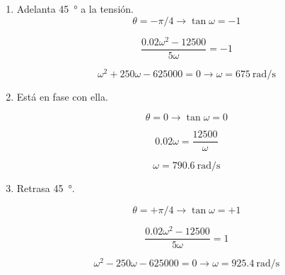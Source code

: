 \documentclass[12pt]{article}
\begin{document}
\begin{enumerate}
\item Adelanta \SI{45}{\degree} a la tensión.
  \begin{equation*}
    \theta = -\pi/4 \rightarrow \tan \omega = -1
  \end{equation*}

  \begin{equation*}
    \frac{0.02\omega^2 - 12500}{5\omega} = -1
  \end{equation*}

  \begin{equation*}
    \omega^2 + 250\omega - 625000 = 0 \rightarrow \boxed{\omega = \SI{675}{\radian\per\second}}
  \end{equation*}

  
\item Está en fase con ella.

  \begin{equation*}
    \theta = 0 \rightarrow \tan \omega = 0
  \end{equation*}

  \begin{equation*}
    0.02\omega = \frac{12500}{\omega}
  \end{equation*}

  \begin{equation*}
    \omega = \SI{790.6}{\radian\per\second}
  \end{equation*}
  
\item Retrasa \SI{45}{\degree}.

  \begin{equation*}
    \theta = +\pi/4 \rightarrow \tan \omega = +1
  \end{equation*}

  \begin{equation*}
    \frac{0.02\omega^2 - 12500}{5\omega} = 1
  \end{equation*}

  \begin{equation*}
    \omega^2 - 250\omega - 625000 = 0 \rightarrow \boxed{\omega = \SI{925.4}{\radian\per\second}}
  \end{equation*}

\end{enumerate}

\clearpage

\section{}
\end{document}
